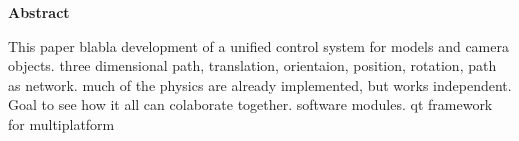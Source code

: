 \vspace*{\fill}
{\centering\huge\bfseries Abstract \par}

This paper blabla development of a unified control system for models and camera objects. three dimensional path, translation, orientaion, position, rotation, path as network. much of the physics are already implemented, but works independent. Goal to see how it all can colaborate together. software modules. qt framework for multiplatform



\vspace*{\fill}